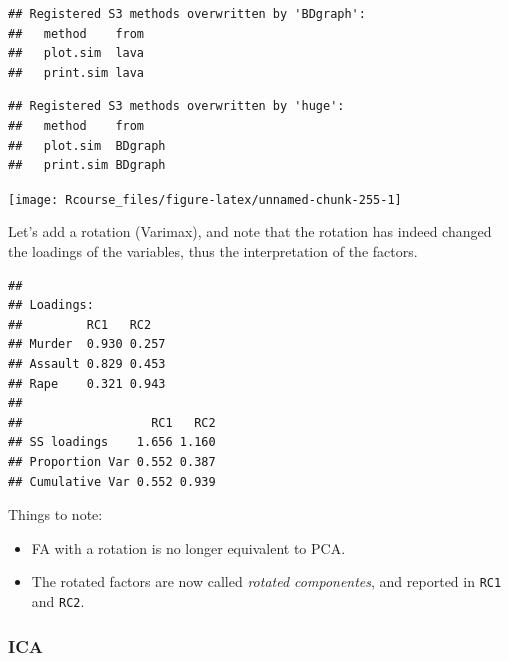 \documentclass[]{book}
\newenvironment{Shaded}{\begin{snugshade}}{\end{snugshade}}
\newcommand{\DataTypeTok}[1]{\textcolor[rgb]{0.13,0.29,0.53}{#1}}
\newcommand{\DecValTok}[1]{\textcolor[rgb]{0.00,0.00,0.81}{#1}}
\newcommand{\FloatTok}[1]{\textcolor[rgb]{0.00,0.00,0.81}{#1}}
\newcommand{\KeywordTok}[1]{\textcolor[rgb]{0.13,0.29,0.53}{\textbf{#1}}}
\newcommand{\NormalTok}[1]{#1}
\newcommand{\OperatorTok}[1]{\textcolor[rgb]{0.81,0.36,0.00}{\textbf{#1}}}
\newcommand{\StringTok}[1]{\textcolor[rgb]{0.31,0.60,0.02}{#1}}
\providecommand{\tightlist}{%
  \setlength{\itemsep}{0pt}\setlength{\parskip}{0pt}}
\theoremstyle{definition}
\theoremstyle{definition}
\theoremstyle{definition}
\theoremstyle{remark}
\begin{document}
\begin{verbatim}
## Registered S3 methods overwritten by 'BDgraph':
##   method    from
##   plot.sim  lava
##   print.sim lava
\end{verbatim}

\begin{verbatim}
## Registered S3 methods overwritten by 'huge':
##   method    from   
##   plot.sim  BDgraph
##   print.sim BDgraph
\end{verbatim}

\texttt{[image: Rcourse\_files/figure-latex/unnamed-chunk-255-1]}

Let's add a rotation (Varimax), and note that the rotation has indeed changed the loadings of the variables, thus the interpretation of the factors.

\begin{Shaded}
\end{Shaded}

\begin{verbatim}
## 
## Loadings:
##         RC1   RC2  
## Murder  0.930 0.257
## Assault 0.829 0.453
## Rape    0.321 0.943
## 
##                  RC1   RC2
## SS loadings    1.656 1.160
## Proportion Var 0.552 0.387
## Cumulative Var 0.552 0.939
\end{verbatim}

Things to note:

\begin{itemize}
\tightlist
\item
  FA with a rotation is no longer equivalent to PCA.
\item
  The rotated factors are now called \emph{rotated componentes}, and reported in \texttt{RC1} and \texttt{RC2}.
\end{itemize}

\hypertarget{ica}{%
\subsubsection{ICA}\label{ica}}
\end{document}
